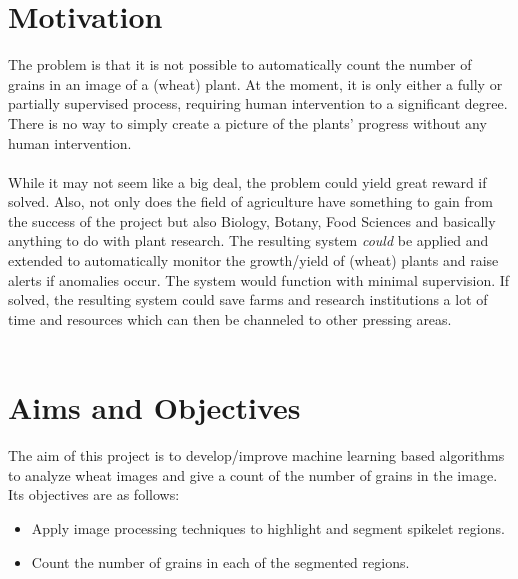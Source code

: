 \section{Motivation}
The problem is that it is not possible to automatically count the number of grains in an image of a (wheat) plant. At the moment, it is only either a fully or partially supervised process, requiring human intervention to a significant degree. There is no way to simply create a picture of the plants' progress without any human intervention.\\ \\
%
While it may not seem like a big deal, the problem could yield great reward if solved. Also, not only does the field of agriculture have something to gain from the success of the project but also Biology, Botany, Food Sciences and basically anything to do with plant research. The resulting system \textit{could} be applied and extended to automatically monitor the growth/yield of (wheat) plants and raise alerts if anomalies occur. The system would function with minimal supervision. If solved, the resulting system could save farms and research institutions a lot of time and resources which can then be channeled to other pressing areas.\\ \\


\bigskip

\goodbreak

\section{Aims and Objectives}
The aim of this project is to develop/improve machine learning based algorithms to analyze wheat images and give a count of the number of grains in the image. Its objectives are as follows:
\begin{itemize}
\item Apply image processing techniques to highlight and segment spikelet regions.
\item Count the number of grains in each of the segmented regions.
\end{itemize}



